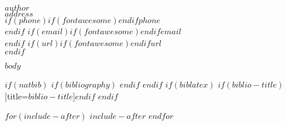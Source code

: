 \documentclass[
$if(fontsize)$ $fontsize$, $endif$
$if(lang)$ $babel-lang$, $endif$
$if(papersize)$ $papersize$paper, $endif$
$for(classoption)$ $classoption$$sep$, $endfor$
]{$documentclass$}
\author{$for(author)$$author$$sep$ \and $endfor$}
\date{$date$}
\begin{document}
\thispagestyle{firstpage} %
\pagestyle{regular} %

\maketitle
\begin{flushright}
{\large \sffamily \bfseries $author$}\\[.35ex]
\emph{\small $address$}\\[.35ex]
$if(phone)$$if(fontawesome)$\faPhone \hspace{1 mm}$endif$\small{$phone$}\\$endif$
$if(email)$$if(fontawesome)$\faEnvelopeO \hspace{1 mm}$endif$\small{\tt $email$}\\$endif$
$if(url)$$if(fontawesome)$\faGlobe \hspace{1 mm}$endif$\small{\href{http://$url$}{\tt $url$}}\\$endif$
\end{flushright}

$body$

$if(natbib)$ $if(bibliography)$  $endif$ $endif$
$if(biblatex)$ \printbibliography$if(biblio-title)$[title=$biblio-title$]$endif$ $endif$

$for(include-after)$ $include-after$ $endfor$
\end{document}
